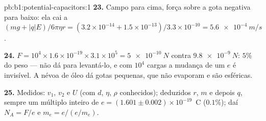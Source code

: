 \begin{solution}{pb:b1:potential-capacitors:1}
\textbf{23.} Campo para cima, força sobre a gota negativa para baixo: ela cai a $(mg
+ |q|E)/6\pi\eta r = (3.2 \times 10^{-14} + 1.5 \times 10^{-13})/3.3 \times 10^{-10} =
\qty{5.6e-4}{m/s}$.

\textbf{24.} $F = 10^4 \times 1.6 \times 10^{-19} \times 3.1 \times 10^5 = \qty{5e-10}{N}$
contra $\qty{9.8e-9}{N}$: $5\%$ do peso --- não dá para levantá-lo, e com
$10^4$ cargas a mudança de um $e$ é invisível. A névoa de óleo dá gotas
pequenas, que não evaporam e são esféricas.

\textbf{25.} Medidos: $v_1$, $v_2$ e $U$ (com $d$, $\eta$, $\rho$ conhecidos);
deduzidos $r$, $m$ e depois $q$, sempre um múltiplo inteiro de
$e = (1.601 \pm 0.002) \times 10^{-19}$~C ($0.1\%$); daí $N_A = F/e$ e
$m_e = e/(e/m_e)$.
\end{solution}
